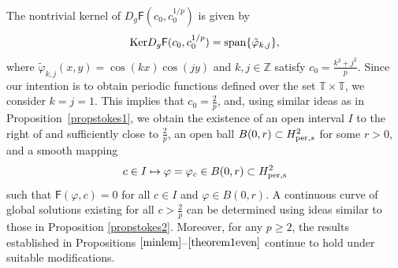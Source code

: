 \documentclass[12pt,reqno,a4paper]{amsart} %
\numberwithin{equation}{section}
\numberwithin{figure}{section}
\begin{document}
The nontrivial kernel of $D_g\mathsf{F}(c_0, c_0^{1/p})$ is given by
\begin{equation}
	{\rm Ker}D_g \mathsf{F}(c_0, c_0^{1/p}) = {\rm span}\{\tilde{\varphi}_{k,j}\},
\end{equation}
where $\tilde{\varphi}_{k,j}(x,y) = \cos(kx)\cos(jy)$ and $k,j\in\mathbb{Z}$ satisfy $c_0=\frac{k^2+j^2}{p}$. Since our intention is to obtain periodic functions defined over the set $\mathbb{T} \times \mathbb{T}$, we consider $k = j = 1$. This implies that $c_0 = \frac{2}{p}$, and, using similar ideas as in Proposition~\ref{propstokes1}, we obtain the existence of an open interval $I$ to the right of and sufficiently close to $\frac{2}{p}$, an open ball $B(0, r) \subset H_{{\rm per}, s}^2$ for some $r > 0$, and a smooth mapping
\begin{equation}\label{localcurve1}c \in I \mapsto \varphi= \varphi_c \in B(0,r) \subset H_{\rm per,s}^{2}\end{equation}
such that $\mathsf{F}(\varphi,c) = 0$ for all $c \in I$ and $\varphi\in B(0,r)$. A continuous curve of global solutions existing for all $c>\frac{2}{p}$ can be determined using ideas similar to those in Proposition \ref{propstokes2}. Moreover, for any $p \geq 2$, the results established in Propositions $\ref{minlem}$–$\ref{theorem1even}$ continue to hold under suitable modifications.
\end{document}
